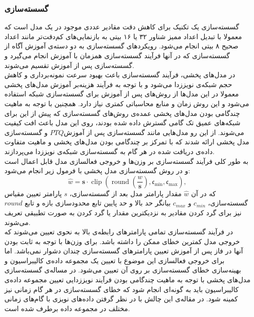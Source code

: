 \subsubsection{گسسته‌سازی}
گسسته‌سازی یک تکنیک برای کاهش دقت مقادیر عددی موجود در یک مدل است که معمولا با تبدیل اعداد ممیز شناور ۳۲ یا ۱۶ بیتی به بازنمایی‌های کم‌دقت‌تر مانند اعداد صحیح ۸ بیتی انجام می‌شود. رویکرد‌های گسسته‌سازی به دو دسته‌ی آموزش آگاه از گسسته‌سازی که در آنها فرآیند گسسته‌سازی همزمان با آموزش انجام می‌گیرد و گسسته‌سازی پس از آموزش تقسیم می‌شوند\cite{shang2023post}.
\\
در مدل‌های پخشی، فرآیند گسسته‌سازی باعث بهبود سرعت نمونه‌برداری و کاهش حجم شبکه‌ی نویززدا می‌شود و با توجه به فرآیند هزینه‌بر آموزش مدل‌های پخشی معمولا در این مدل‌ها از روش‌های پس از آموزش برای گسسته‌سازی شبکه استفاده می‌شود و این روش زمان و منابع محاسباتی کمتری نیاز دارد\cite{shang2023post}. همچنین با توجه به ماهیت چندگامی بودن مدل‌های پخشی عمده‌ی روش‌های گسسته‌سازی که پیش از این برای شبکه‌های عمیق تک گامی گسترش داده شده بودند، روی این مدل باعث افت کیفیت می‌شوند. از این رو مدل‌هایی مانند گسسته‌سازی پس از آموزش$PTQ$ \cite{shang2023post}و گسسته‌سازی مدل پخشی \cite{li2023q} ارائه شدند که با تمرکز بر چندگامی بودن مدل‌های پخشی و ماهیت متفاوت داده‌ی دریافت شده در هر گام به گسسته‌سازی شبکه‌ی نویززدا می‌پردازند.
\\
به طور کلی فرآیند گسسته‌سازی بر وزن‌ها و خروجی فعالسازی مدل قابل اعمال است و در روش گسسته‌سازی مدل پخشی\cite{li2023q} با فرمول زیر انجام می‌شود:
\begin{equation}
		\hat{w} = \mathbf{s} \cdot \operatorname{clip}\left(\operatorname{round}\left(\frac{w}{\mathbf{s}}\right), \mathfrak{c}_{\min}, \mathfrak{c}_{\max}\right),
\end{equation}
که در آن $\hat{w}$ مقدار پارامتر مدل بعد از گسسته‌سازی، $s$ پارامتر تعیین مقیاس گسسته‌سازی، $c_{min}$ و $c_{max}$ بیانگر حد بالا و حد پایین تابع محدودسازی بازه و تابع $round$ نیز برای گرد کردن مقادیر به نزدیکترین مقدار یا گرد کردن به صورت تطبیقی تعریف می‌شوند.
\\
در فرآیند گسسته‌سازی تمامی پارامترهای رابطه‌ی بالا به نحوی تعیین می‌شوند که خروجی مدل کمترین خطای ممکن را داشته باشد. برای وزن‌ها با توجه به ثابت بودن آنها در فاز پس از آموزش تعیین پارامتر‌های گسسته‌سازی چندان دشوار نمی‌باشد. اما برای خروجی فعالسازی این موضوع با تعیین یک مجموعه داده‌ی کالیبراسیون و بهینه‌سازی خطای گسسته‌سازی بر روی آن تعیین می‌شود. در مساله‌ی گسسته‌سازی مدل‌های پخشی با توجه به ماهیت چندگامی بودن فرآیند نویززدایی تعیین مجموعه داده‌ی کالیبراسیون باید به گونه‌ای انجام شود که خطای گسسته‌سازی در هر گام زمانی نیز کمینه شود. در مقاله‌ی \cite{li2023q} این چالش با در نظر گرفتن داده‌های نویزی با گام‌های زمانی مختلف در مجموعه داده برطرف شده است.

